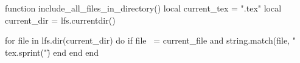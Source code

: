 \ifluatex
\begin{luacode*}
    function include_all_files_in_directory()
        local current_tex = "\jobname.tex"
        local current_dir = lfs.currentdir()

        for file in lfs.dir(current_dir) do
            if file ~= current_file and string.match(file, "%
                tex.sprint("\")
            end 
        end 
    end
\end{luacode*}
\fi